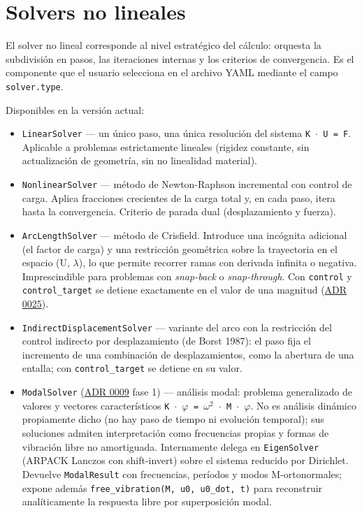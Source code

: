 \documentclass[11pt,oneside]{report}
\begin{document}
\section{Solvers no lineales}

El solver no lineal corresponde al nivel estratégico del cálculo: orquesta la subdivisión en pasos, las iteraciones internas y los criterios de convergencia. Es el componente que el usuario selecciona en el archivo YAML mediante el campo \texttt{solver.type}.

Disponibles en la versión actual:

\begin{itemize}
  \item \texttt{LinearSolver} --- un único paso, una única resolución del sistema \texttt{K \ensuremath{\cdot} U = F}. Aplicable a problemas estrictamente lineales (rigidez constante, sin actualización de geometría, sin no linealidad material).
  \item \texttt{NonlinearSolver} --- método de Newton-Raphson incremental con control de carga. Aplica fracciones crecientes de la carga total y, en cada paso, itera hasta la convergencia. Criterio de parada dual (desplazamiento y fuerza).
  \item \texttt{ArcLengthSolver} --- método de Crisfield. Introduce una incógnita adicional (el factor de carga) y una restricción geométrica sobre la trayectoria en el espacio (U, \ensuremath{\lambda}), lo que permite recorrer ramas con derivada infinita o negativa. Imprescindible para problemas con \textit{snap-back} o \textit{snap-through}. Con \texttt{control} y \texttt{control\_target} se detiene exactamente en el valor de una magnitud (\hyperref[adr:0025]{ADR 0025}).
  \item \texttt{IndirectDisplacementSolver} --- variante del arco con la restricción del control indirecto por desplazamiento (de Borst 1987): el paso fija el incremento de una combinación de desplazamientos, como la abertura de una entalla; con \texttt{control\_target} se detiene en su valor.
  \item \texttt{ModalSolver} (\hyperref[adr:0009]{ADR 0009} fase 1) --- análisis modal: problema generalizado de valores y vectores característicos \texttt{K \ensuremath{\cdot} \ensuremath{\varphi} = \ensuremath{\omega}\ensuremath{^{2}} \ensuremath{\cdot} M \ensuremath{\cdot} \ensuremath{\varphi}}. No es análisis dinámico propiamente dicho (no hay paso de tiempo ni evolución temporal); sus soluciones admiten interpretación como frecuencias propias y formas de vibración libre no amortiguada. Internamente delega en \texttt{EigenSolver} (ARPACK Lanczos con shift-invert) sobre el sistema reducido por Dirichlet. Devuelve \texttt{ModalResult} con frecuencias, períodos y modos M-ortonormales; expone además \texttt{free\_\allowbreak{}vibration(M, u0, u0\_\allowbreak{}dot, t)} para reconstruir analíticamente la respuesta libre por superposición modal.

\end{itemize}
\end{document}
